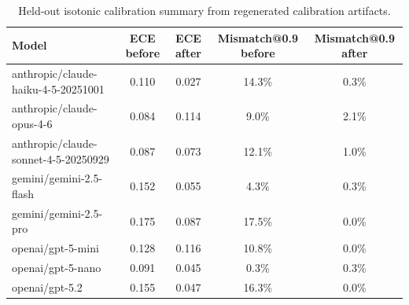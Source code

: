 \begin{table}[t]
\centering
\small
\begin{tabular}{lcccc}
\toprule
Model & ECE before & ECE after & Mismatch@0.9 before & Mismatch@0.9 after \\
\midrule
anthropic/claude-haiku-4-5-20251001 & 0.110 & 0.027 & 14.3\% & 0.3\% \\
anthropic/claude-opus-4-6 & 0.084 & 0.114 & 9.0\% & 2.1\% \\
anthropic/claude-sonnet-4-5-20250929 & 0.087 & 0.073 & 12.1\% & 1.0\% \\
gemini/gemini-2.5-flash & 0.152 & 0.055 & 4.3\% & 0.3\% \\
gemini/gemini-2.5-pro & 0.175 & 0.087 & 17.5\% & 0.0\% \\
openai/gpt-5-mini & 0.128 & 0.116 & 10.8\% & 0.0\% \\
openai/gpt-5-nano & 0.091 & 0.045 & 0.3\% & 0.3\% \\
openai/gpt-5.2 & 0.155 & 0.047 & 16.3\% & 0.0\% \\
\bottomrule
\end{tabular}
\caption{Held-out isotonic calibration summary from regenerated calibration artifacts.}
\label{tab:calibration}
\end{table}
